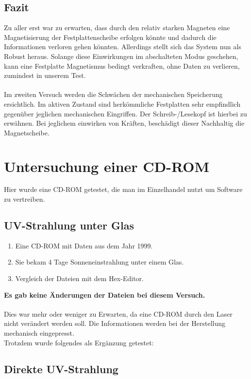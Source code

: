 \documentclass[10pt,a4paper]{article} %
\begin{document}
\subsection{Fazit}
Zu aller erst war zu erwarten, dass durch den relativ starken Magneten eine Magnetisierung der Festplattenscheibe erfolgen könnte und dadurch die Informationen verloren gehen könnten. Allerdings stellt sich das System nun als Robust heraus. Solange diese Einwirkungen im abschalteten Modus geschehen, kann eine Festplatte Magnetismus bedingt verkraften, ohne Daten zu verlieren, zumindest in unserem Test.\\\\
Im zweiten Versuch werden die Schwächen der mechanischen Speicherung ersichtlich. Im aktiven Zustand sind herkömmliche Festplatten sehr empfindlich gegenüber jeglichen mechanischen Eingriffen. Der Schreib-/Lesekopf ist hierbei zu erwähnen. Bei jeglichem einwirken von Kräften, beschädigt dieser Nachhaltig die Magnetscheibe.

\newpage




\section{Untersuchung einer CD-ROM}
Hier wurde eine CD-ROM getestet, die man im Einzelhandel nutzt um Software zu vertreiben. 

\subsection{UV-Strahlung unter Glas}

\begin{enumerate}
\item Eine CD-ROM mit Daten aus dem Jahr 1999.
\item Sie bekam 4 Tage Sonneneinstrahlung unter einem Glas.
\item Vergleich der Dateien mit dem Hex-Editor.
\end{enumerate}

\textbf{Es gab keine Änderungen der Dateien bei diesem Versuch.}\\\\
Dies war mehr oder weniger zu Erwarten, da eine CD-ROM durch den Laser nicht verändert werden soll. Die Informationen werden bei der Herstellung mechanisch eingepresst.
\\
Trotzdem wurde folgendes als Ergänzung getestet:

\subsection{Direkte UV-Strahlung}
\end{document}
